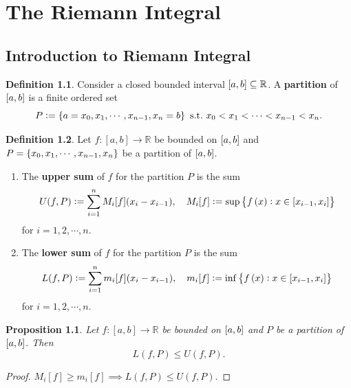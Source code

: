 \documentclass[12pt,openany]{book}
\newtheorem{proposition}[theorem]{Proposition}
\theoremstyle{definition}
\newtheorem{definition}{Definition}[chapter]
\newcommand{\R}{\mathbb{R}}
\newcommand{\of}[1]{\left( #1 \right)}
\begin{document}
	\newpage
	\chapter{The Riemann Integral}
	
	\section{Introduction to Riemann Integral}
	\begin{tcolorbox}[colframe=defcolor, title={\color{white}\bf Parition}]
		\begin{definition}
			Consider a closed bounded interval \(\sbr{a,b}\subseteq\R\). A \textbf{partition} of \(\sbr{a,b}\) is a finite ordered set \[
			P:=\set{a=x_0,x_1,\cdots,x_{n-1},x_n=b}\ \text{s.t.}\ x_0<x_1<\cdots<x_{n-1}<x_n.
			\]
		\end{definition}
	\end{tcolorbox}
	\vspace{8pt}
	\begin{tcolorbox}[colframe=defcolor, title={\color{white}\bf Upper and Lower Sum}]
		\begin{definition}
			Let \(f:[a,b]\to\R\) be bounded on \(\sbr{a,b}\) and \(P=\set{x_0,x_1,\cdots,x_{n-1},x_n}\) be a partition of \(\sbr{a,b}\).
			\begin{enumerate}[(1)]
				\item The \textbf{upper sum} of \(f\) for the partition \(P\) is the sum \[
				U(f,P):=\sum_{i=1}^{n}M_i[f](x_i-x_{i-1}),\quad M_i[f]:=\sup\set{f\of{x}:x\in\sbr{x_{i-1},x_i}}
				\] for \(i=1,2,\cdots, n\).
				\item The \textbf{lower sum} of \(f\) for the partition \(P\) is the sum \[
				L(f,P):=\sum_{i=1}^{n}m_i[f](x_i-x_{i-1}),\quad m_i[f]:=\inf\set{f\of{x}:x\in\sbr{x_{i-1},x_i}}
				\] for \(i=1,2,\cdots, n\).
			\end{enumerate}
		\end{definition}
	\end{tcolorbox}
	\begin{tcolorbox}[colframe=procolor, title={\color{white}\bf }]
		\begin{proposition}
			Let \(f:[a,b]\to\R\) be bounded on \(\sbr{a,b}\) and \(P\) be a partition of \(\sbr{a,b}\). Then \[
			L(f,P)\leq U(f,P).
			\]
		\end{proposition}
	\end{tcolorbox}
	\begin{proof}
		\(M_i[f]\geq m_i[f]\implies L(f,P)\leq U(f,P)\).
	\end{proof}
	
\end{document}
